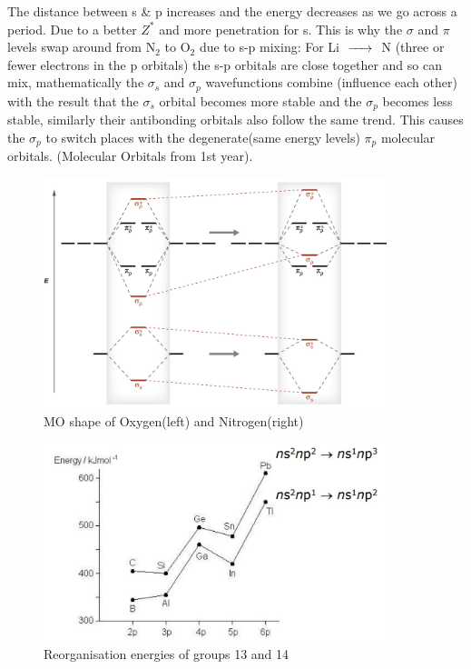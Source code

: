 \documentclass{article}
\begin{document}
    The distance between s \& p increases and the energy decreases as 
    we go across a period. Due to a better \(Z^*\) and more penetration for s. This is why the \(\sigma\) and \(\pi\)
    levels swap around from N\(_2\) to O\(_2\) due to s-p mixing: 
    For Li \(\ce{->}\) N (three or fewer electrons in the p orbitals) the s-p orbitals are close together and so
    can mix, mathematically the \(\sigma_{s}\) and \(\sigma_{p}\) wavefunctions combine (influence each other) with the result that the 
    \(\sigma_{s}\) orbital becomes more stable and the \(\sigma_{p}\) becomes less stable, similarly their antibonding orbitals also
    follow the same trend. This causes the \(\sigma_{p}\) to switch places with the degenerate(same energy levels) \(\pi_{p}\)
    molecular orbitals. (Molecular Orbitals from 1st year). 

    \begin{figure}[h]
        \centering
        \includegraphics[width=10cm]{MO.jpg}
        \caption{MO shape of Oxygen(left) and Nitrogen(right)}
    \end{figure}

    \begin{figure}[h]
        \centering
        \includegraphics[width=10cm]{trans.jpg}
        \caption{Reorganisation energies of groups 13 and 14}
    \end{figure}
\end{document}
